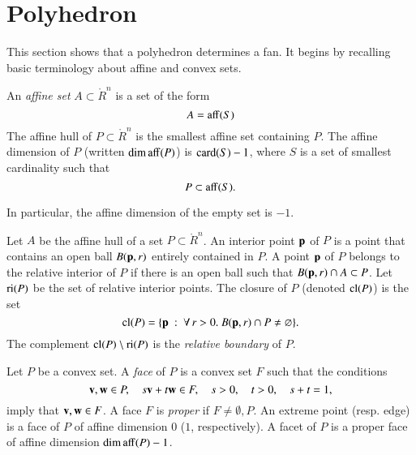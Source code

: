 \section{Polyhedron}

This section shows that a polyhedron determines a fan.  It begins by recalling basic terminology about affine and convex sets.

\begin{definition}
An  {\it affine set} $A\subset\ring{R}^n$ is a set of the form
$$
A={\operatorname{aff}}(S)
$$
The
affine hull of $P\subset\ring{R}^n$ is the smallest affine set containing $P$.  The affine dimension of $P$ (written $\operatorname{dim\,aff}(P)$) is ${\operatorname{card}}(S)-1$, where $S$ is a set of smallest cardinality such that
$$
P \subset {\operatorname{aff}}(S).
$$
\end{definition}
In particular, the affine dimension of the empty set is $-1$.
%
%
%
%
%

\begin{definition} Let $A$ be the affine hull of a set $P\subset\ring{R}^n$.    An interior point ${\mathbf p}$ of $P$ is a point that contains an open ball $B({\mathbf p},r)$ entirely contained in $P$.  A point ${\mathbf p}$ of $P$ belongs to the relative interior of $P$ if there is an open ball such that $B({\mathbf p},r) \cap A\subset P$.  Let ${\operatorname{ri}}(P)$ be the set of relative interior points.  The closure of $P$ (denoted ${\operatorname{cl}}(P)$)  is the set
$$
{\operatorname{cl}}(P) = \{{\mathbf p} \ :\  \forall\,r >0.~ B({\mathbf p},r) \cap P \ne \varnothing\}.
$$
The complement ${\operatorname{cl}}(P)\setminus {\operatorname{ri}}(P)$ is the {\it relative boundary} of $P$.
\end{definition}
%
%
%
%
%
%
%

\begin{definition}
Let $P$ be a convex set.  A {\it face} of $P$ is a convex set $F$ such that the conditions
$$
{\mathbf v},{\mathbf w}\in P,\quad s {\mathbf v} + t {\mathbf w} \in F,\quad s>0,\quad t>0,\quad s+t = 1,
$$ 
imply that ${\mathbf v},{\mathbf w}\in F$.  A face $F$ is {\it proper} if $F\ne \emptyset,P$.    An extreme point (resp. edge) is a face of $P$ of affine dimension $0$ ($1$, respectively).   A facet of $P$ is a proper face of affine dimension $\operatorname{dim\,aff}(P)-1$.
%
%
%
%
%
\end{definition}

